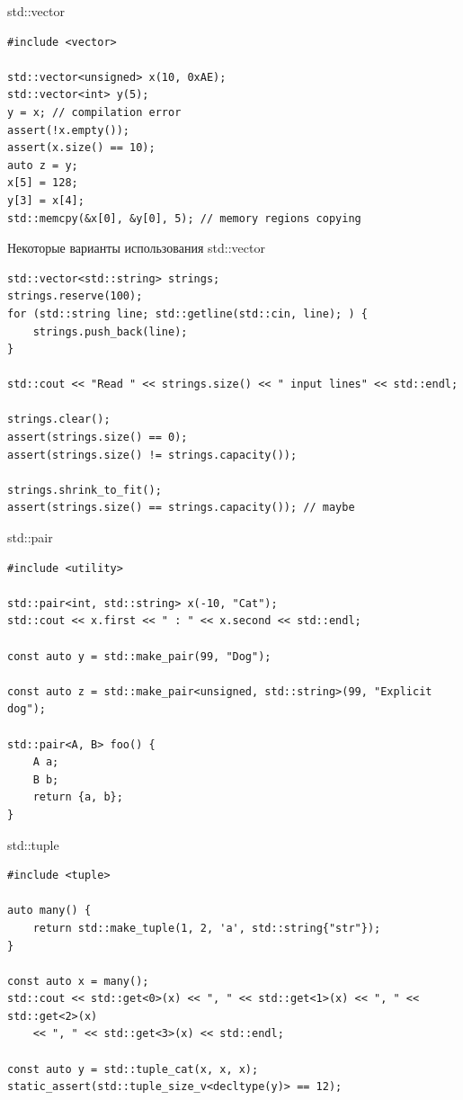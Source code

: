 \documentclass[unknownkeysallowed,xcolor=table]{beamer}
\begin{document}
\begin{frame}[fragile]{std::vector}

\begin{lstlisting}
#include <vector>

std::vector<unsigned> x(10, 0xAE);
std::vector<int> y(5);
y = x; // compilation error
assert(!x.empty());
assert(x.size() == 10);
auto z = y;
x[5] = 128;
y[3] = x[4];
std::memcpy(&x[0], &y[0], 5); // memory regions copying
\end{lstlisting}

\end{frame}

\begin{frame}[fragile]{Некоторые варианты использования std::vector}

\begin{lstlisting}
std::vector<std::string> strings;
strings.reserve(100);
for (std::string line; std::getline(std::cin, line); ) {
    strings.push_back(line);
}

std::cout << "Read " << strings.size() << " input lines" << std::endl;

strings.clear();
assert(strings.size() == 0);
assert(strings.size() != strings.capacity());

strings.shrink_to_fit();
assert(strings.size() == strings.capacity()); // maybe
\end{lstlisting}

\end{frame}

\begin{frame}[fragile]{std::pair}

\begin{lstlisting}
#include <utility>

std::pair<int, std::string> x(-10, "Cat");
std::cout << x.first << " : " << x.second << std::endl;

const auto y = std::make_pair(99, "Dog");

const auto z = std::make_pair<unsigned, std::string>(99, "Explicit dog");

std::pair<A, B> foo() {
    A a;
    B b;
    return {a, b};
}
\end{lstlisting}

\end{frame}

\begin{frame}[fragile]{std::tuple}

\begin{lstlisting}
#include <tuple>

auto many() {
    return std::make_tuple(1, 2, 'a', std::string{"str"});
}

const auto x = many();
std::cout << std::get<0>(x) << ", " << std::get<1>(x) << ", " << std::get<2>(x)
    << ", " << std::get<3>(x) << std::endl;

const auto y = std::tuple_cat(x, x, x);
static_assert(std::tuple_size_v<decltype(y)> == 12);
\end{lstlisting}

\end{frame}
\end{document}
